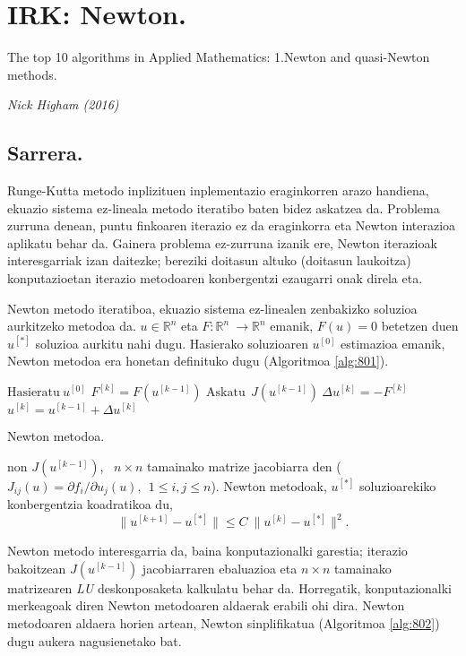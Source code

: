 \chapter{IRK: Newton.}

\epigraph{The top 10 algorithms in Applied Mathematics: 1.Newton and quasi-Newton methods.}
{\textit {Nick Higham (2016)}}

\section{Sarrera.}

Runge-Kutta metodo inplizituen inplementazio eraginkorren arazo handiena, ekuazio sistema ez-lineala metodo iteratibo baten bidez askatzea da. Problema zurruna denean, puntu finkoaren iterazio ez da eraginkorra eta Newton interazioa aplikatu behar da. Gainera problema ez-zurruna izanik ere, Newton iterazioak interesgarriak izan daitezke; bereziki doitasun altuko (doitasun laukoitza) konputazioetan iterazio metodoaren konbergentzi ezaugarri onak direla eta. 
 
Newton metodo iteratiboa, ekuazio sistema ez-linealen zenbakizko soluzioa aurkitzeko metodoa da. $u\in \mathbb{R}^{n}$ eta $F: \mathbb{R}^n \ \longrightarrow {\mathbb{R}}^n$ emanik, $F(u)=0$ betetzen duen $u^{[*]}$ soluzioa aurkitu nahi dugu. Hasierako soluzioaren $u^{[0]}$ estimazioa  emanik,  Newton metodoa era honetan definituko dugu (Algoritmoa \ref{alg:801}).

\begin{algorithm}[H]
  $ \text{Hasieratu} \ u^{[0]}$\;
  {
   \BlankLine
   $F^{[k]}=F(u^{[k-1]})$\;
   $\text{Askatu} \ \ J(u^{[k-1]}) \ \Delta u^{[k]}=- F^{[k]}$\;
   \BlankLine
   $u^{[k]}=u^{[k-1]}+\Delta u^{[k]}$\;
  }
 \caption{Newton metodoa.}
 \label{alg:801}
\end{algorithm}

non $J(u^{[k-1]})$, \ $n \times n$ tamainako matrize jacobiarra den ($J_{ij}(u)=\partial f_i/\partial u_j (u), \ \ 1 \leq i,j \leq n$).  Newton metodoak, $u^{[*]}$ soluzioarekiko konbergentzia koadratikoa du,
\begin{equation*}
\label{eq:801}
\|u^{[k+1]}-u^{[*]}\| \le C \ \|u^{[k]}-u^{[*]}\|^2.
\end{equation*}

Newton metodo interesgarria da, baina konputazionalki garestia; iterazio bakoitzean $J(u^{[k-1]})$ jacobiarraren ebaluazioa eta $n \times n$ tamainako matrizearen \emph{LU} deskonposaketa kalkulatu behar da. Horregatik, konputazionalki merkeagoak diren Newton metodoaren aldaerak erabili ohi dira. Newton metodoaren aldaera horien artean, Newton sinplifikatua (Algoritmoa \ref{alg:802}) dugu aukera nagusienetako bat.

